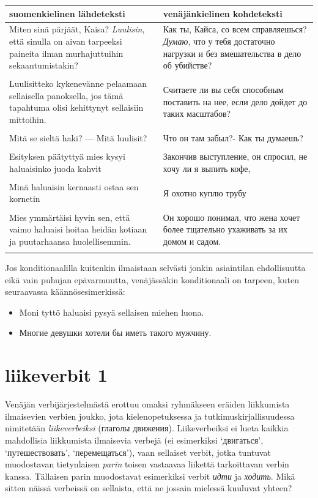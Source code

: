 \documentclass[]{scrreprt}
\providecommand{\tightlist}{%
  \setlength{\itemsep}{0pt}\setlength{\parskip}{0pt}}
\begin{document}
\begin{longtable}[c]{p{7.2cm}p{7.2cm}}
\toprule
suomenkielinen lähdeteksti & venäjänkielinen kohdeteksti\tabularnewline
\midrule
\endhead
Miten sinä pärjäät, Kaisa? \emph{Luulisin}, että sinulla on aivan
tarpeeksi paineita ilman murhajuttuihin sekaantumistakin? & Как ты,
Кайса, со всем справляешься? \emph{Думаю}, что у тебя достаточно
нагрузки и без вмешательства в дело об убийстве?\\ 
\tabularnewline
Luulisitteko kykenevänne pelaamaan sellaisella panoksella, jos tämä
tapahtuma olisi kehittynyt sellaisiin mittoihin. & Считаете ли вы себя
способным поставить на нее, если дело дойдет до таких
масштабов? \\ \tabularnewline
Mitä se sieltä haki? --- Mitä luulisit? & Что он там забыл?- Как ты
думаешь?\\ \tabularnewline
Esityksen päätyttyä mies kysyi haluaisinko juoda kahvit & Закончив
выступление, он спросил, не хочу ли я выпить кофе,\\ \tabularnewline
Minä haluaisin kernaasti ostaa sen kornetin & Я охотно куплю
трубу\\ \tabularnewline
Mies ymmärtäisi hyvin sen, että vaimo haluaisi hoitaa heidän kotiaan ja
puutarhaansa huolellisemmin. & Он хорошо понимал, что жена хочет более
тщательно ухаживать за их домом и садом.\\ \tabularnewline
\bottomrule
\end{longtable}

Jos konditionaalilla kuitenkin ilmaistaan selvästi jonkin asiaintilan
ehdollisuutta eikä vain puhujan epävarmuutta, venäjässäkin konditionaali
on tarpeen, kuten seuraavassa käännösesimerkissä:

\begin{itemize}
\tightlist
\item
  Moni tyttö haluaisi pysyä sellaisen miehen luona.\\
\item
  Многие девушки хотели бы иметь такого мужчину.
\end{itemize}

\chapter{liikeverbit 1}\label{luento-20-liikeverbit-1}


Venäjän verbijärjestelmästä erottuu omaksi ryhmäkseen eräiden
liikkumista ilmaisevien verbien joukko, jota kielenopetuksessa ja
tutkimuskirjallisuudessa nimitetään \emph{liikeverbeiksi} (глаголы
движения). Liikeverbeiksi ei lueta kaikkia mahdollisia liikkumista
ilmaisevia verbejä (ei esimerkiksi `двигаться', `путешествовать',
`перемещаться'), vaan sellaiset verbit, jotka tuntuvat muodostavan
tietynlaisen \emph{parin} toisen vastaavaa liikettä tarkoittavan verbin
kanssa. Tällaisen parin muodostavat esimerkiksi verbit \emph{идти} ja
\emph{ходить}. Mikä sitten näissä verbeissä on sellaista, että ne
jossain mielessä kuuluvat yhteen?
\end{document}
